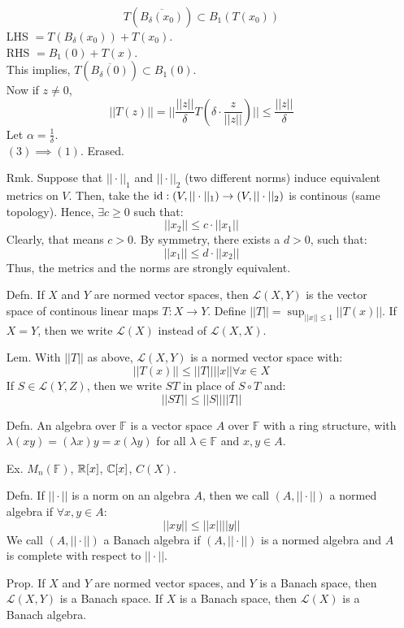\documentclass[12pt]{article}
\begin{document}
\begin{itemize}
    \[ T(\overline{B_\delta(x_0)}) \subset B_1(T(x_0))\]
    LHS $ = T(B_\delta(x_0)) + T(x_0)$. \\
    RHS $ = B_1(0) + T(x)$. \\
    This implies, $T(\overline{B_\delta(0)}) \subset B_1(0)$. \\
    Now if $z \neq 0$, 
    \[  ||T(z) || = || \frac{||z||}{\delta} T(\delta \cdot \frac{z}{||z||})|| \leq \frac{||z||}{\delta}\]
    Let $\alpha = \frac{1}{\delta}$. \\
    $(3) \implies (1)$. Erased. 
    \item[Rmk.] Suppose that $||\cdot||_1$ and $||\cdot ||_2$ (two different norms) induce equivalent metrics on $V$. Then, take the $\operatorname{id}: (V, ||\cdot||_1) \to (V, ||\cdot||_2)$ is continous (same topology). Hence, $\exists c \geq 0$ such that: 
    \[ ||x_2|| \leq c \cdot ||x_1||\]  
    Clearly, that means $c > 0$. By symmetry, there exists a $d > 0$, such that:
    \[ ||x_1|| \leq d \cdot ||x_2||\]
    Thus, the metrics and the norms are strongly equivalent.
    \item[Defn.] If $X$ and $Y$ are normed vector spaces, then $\mathcal{L}(X, Y)$ is the vector space of continous linear maps $T: X \to Y$. Define $||T|| = \sup_{||x|| \leq 1} ||T(x)||$. If $X = Y$, then we write $\mathcal{L}(X)$ instead of $\mathcal{L}(X, X)$.
    \item[Lem.] With $||T||$ as above, $\mathcal{L}(X,Y)$ is a normed vector space with:
    \[ ||T(x)|| \leq ||T||||x|| \forall x \in X\]
    If $S \in \mathcal{L}(Y, Z)$, then we write $ST$ in place of $S \circ T$ and: 
    \[ ||ST|| \leq ||S||||T||\]
    \item[Defn.] An algebra over $\mathbb{F}$ is a vector space $A$ over $\mathbb{F}$ with a ring structure, with $\lambda(xy) = (\lambda x)y = x(\lambda y)$ for all $\lambda \in \mathbb{F}$ and $x, y \in A$.
    \item[Ex. ] $M_n(\mathbb{F})$, $\mathbb R[x]$, $\mathbb C[x]$, $C(X)$. 
    \item[Defn.] If $||\cdot||$ is a norm on an algebra $A$, then we call $(A, ||\cdot||)$ a normed algebra if $\forall x,y \in A$: 
    \[ ||xy|| \leq ||x||||y|| \]
    We call $(A, ||\cdot||)$ a Banach algebra if $(A, ||\cdot||)$ is a normed algebra and $A$ is complete with respect to $||\cdot||$.
    \item[Prop.] If $X$ and $Y$ are normed vector spaces, and $Y$ is a Banach space, then $\mathcal{L}(X,Y)$ is a Banach space. If $X$ is a Banach space, then $\mathcal{L}(X)$ is a Banach algebra. \\

\end{itemize}
\end{document}
